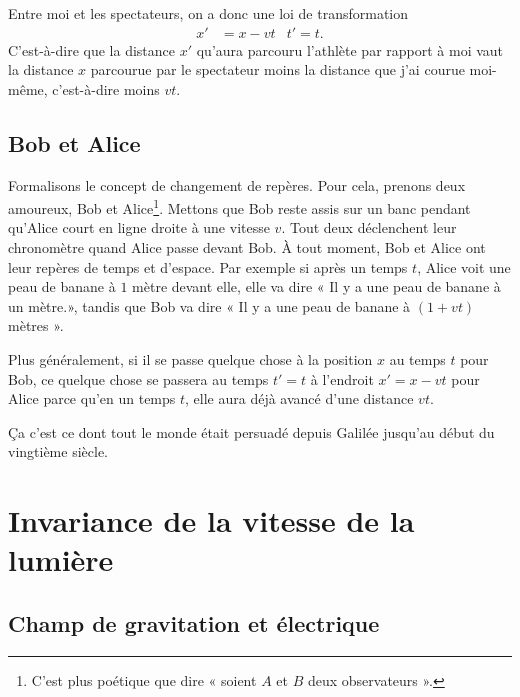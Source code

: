 Entre moi et les spectateurs, on a donc une loi de transformation
\begin{align}		\label{EqTransGal}
	x' & =x-vt & t'=t.
\end{align}
C'est-à-dire que la distance \( x'\) qu'aura parcouru l'athlète par rapport à moi vaut la distance \( x\) parcourue par le spectateur moins la distance que j'ai courue moi-même, c'est-à-dire moins \( vt\).

\subsection{Bob et Alice}

Formalisons le concept de changement de repères. Pour cela, prenons deux amoureux, Bob et Alice\footnote{C'est plus poétique que dire « soient \( A\) et \( B\) deux observateurs ».}. Mettons que Bob reste assis sur un banc pendant qu'Alice court en ligne droite à une vitesse \( v\). Tout deux déclenchent leur chronomètre quand Alice passe devant Bob. À tout moment, Bob et Alice ont leur repères de temps et d'espace. Par exemple si après un temps \( t\), Alice voit une peau de banane à \( 1\) mètre devant elle, elle va dire « Il y a une peau de banane à un mètre.», tandis que Bob va dire « Il y a une peau de banane à \( (1+vt)\) mètres ».

Plus généralement, si il se passe quelque chose à la position \( x\) au temps \( t\) pour Bob, ce quelque chose se passera au temps \( t'=t\) à l'endroit \( x'=x-vt\) pour Alice parce qu'en un temps \( t\), elle aura déjà avancé d'une distance \( vt\).

Ça c'est ce dont tout le monde était persuadé depuis Galilée jusqu'au début du vingtième siècle.

%
\section{Invariance de la vitesse de la lumière}
%

\subsection{Champ de gravitation et électrique}

